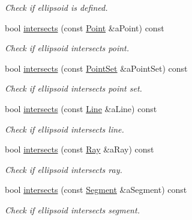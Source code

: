 \begin{DoxyCompactItemize}
\begin{DoxyCompactList}\small\item\em Check if ellipsoid is defined. \end{DoxyCompactList}\item 
bool \hyperlink{classostk_1_1math_1_1geom_1_1d3_1_1objects_1_1_ellipsoid_ac138fc763cca5a3687be35fe6cdba586}{intersects} (const \hyperlink{classostk_1_1math_1_1geom_1_1d3_1_1objects_1_1_point}{Point} \&a\+Point) const
\begin{DoxyCompactList}\small\item\em Check if ellipsoid intersects point. \end{DoxyCompactList}\item 
bool \hyperlink{classostk_1_1math_1_1geom_1_1d3_1_1objects_1_1_ellipsoid_aba612161728349d5302ce7625674893e}{intersects} (const \hyperlink{classostk_1_1math_1_1geom_1_1d3_1_1objects_1_1_point_set}{Point\+Set} \&a\+Point\+Set) const
\begin{DoxyCompactList}\small\item\em Check if ellipsoid intersects point set. \end{DoxyCompactList}\item 
bool \hyperlink{classostk_1_1math_1_1geom_1_1d3_1_1objects_1_1_ellipsoid_ade6288d324e3227eafd0126fc4680471}{intersects} (const \hyperlink{classostk_1_1math_1_1geom_1_1d3_1_1objects_1_1_line}{Line} \&a\+Line) const
\begin{DoxyCompactList}\small\item\em Check if ellipsoid intersects line. \end{DoxyCompactList}\item 
bool \hyperlink{classostk_1_1math_1_1geom_1_1d3_1_1objects_1_1_ellipsoid_aa12b5c24a22e121b18c3022ce0534a29}{intersects} (const \hyperlink{classostk_1_1math_1_1geom_1_1d3_1_1objects_1_1_ray}{Ray} \&a\+Ray) const
\begin{DoxyCompactList}\small\item\em Check if ellipsoid intersects ray. \end{DoxyCompactList}\item 
bool \hyperlink{classostk_1_1math_1_1geom_1_1d3_1_1objects_1_1_ellipsoid_ac7fc0339626b86b044d3c1a8fc174211}{intersects} (const \hyperlink{classostk_1_1math_1_1geom_1_1d3_1_1objects_1_1_segment}{Segment} \&a\+Segment) const
\begin{DoxyCompactList}\small\item\em Check if ellipsoid intersects segment. \end{DoxyCompactList}\item 

\end{DoxyCompactItemize}
